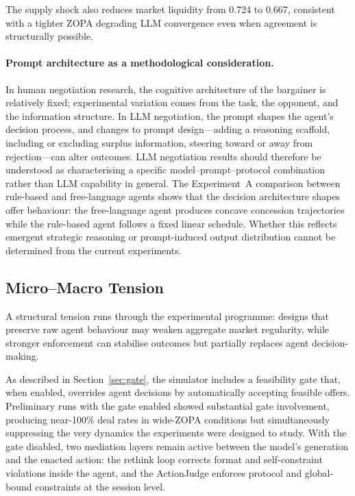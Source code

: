 The supply shock also reduces market liquidity from 0.724 to 0.667, consistent with a tighter ZOPA degrading LLM convergence even when agreement is structurally possible.

\paragraph{Prompt architecture as a methodological consideration.}
In human negotiation research, the cognitive architecture of the bargainer is relatively fixed; experimental variation comes from the task, the opponent, and the information structure.  In LLM negotiation, the prompt shapes the agent's decision process, and changes to prompt design---adding a reasoning scaffold, including or excluding surplus information, steering toward or away from rejection---can alter outcomes.  LLM negotiation results should therefore be understood as characterising a specific model--prompt--protocol combination rather than LLM capability in general.  The Experiment~A comparison between rule-based and free-language agents shows that the decision architecture shapes offer behaviour: the free-language agent produces concave concession trajectories while the rule-based agent follows a fixed linear schedule.  Whether this reflects emergent strategic reasoning or prompt-induced output distribution cannot be determined from the current experiments.

\subsection{Micro--Macro Tension}
\label{sec:disc-micro-macro}

A structural tension runs through the experimental programme: designs that preserve raw agent behaviour may weaken aggregate market regularity, while stronger enforcement can stabilise outcomes but partially replaces agent decision-making.

As described in Section~\ref{sec:gate}, the simulator includes a feasibility gate that, when enabled, overrides agent decisions by automatically accepting feasible offers.  Preliminary runs with the gate enabled showed substantial gate involvement, producing near-100\% deal rates in wide-ZOPA conditions but simultaneously suppressing the very dynamics the experiments were designed to study.  With the gate disabled, two mediation layers remain active between the model's generation and the enacted action: the rethink loop corrects format and self-constraint violations inside the agent, and the ActionJudge enforces protocol and global-bound constraints at the session level.

